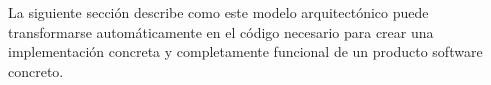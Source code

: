 
La siguiente sección describe como este modelo arquitectónico puede transformarse automáticamente en el código necesario para crear una implementación concreta y completamente funcional de un producto software concreto.

